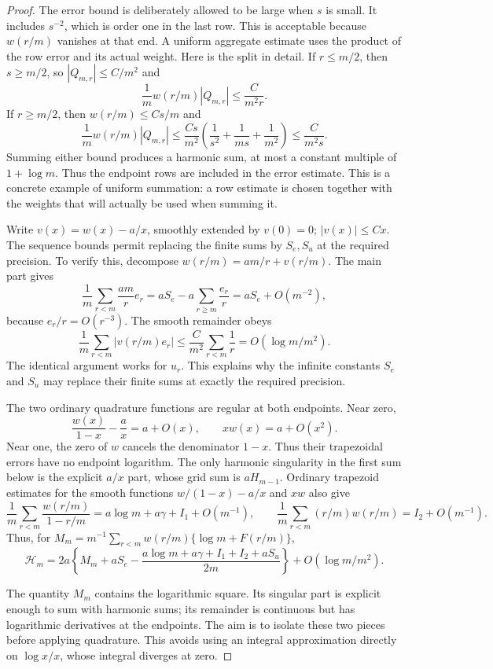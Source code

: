 \begin{proof}
The error bound is deliberately allowed to be large when $s$ is
small. It includes $s^{-2}$, which is order one in the last row.
This is acceptable because $w(r/m)$ vanishes at that end.
A uniform aggregate estimate uses the product of the row error and
its actual weight.
Here is the split in detail. If $r\leq m/2$, then $s\geq m/2$,
so $|Q_{m,r}|\leq C/m^2$ and
\[
 \frac1m w(r/m)|Q_{m,r}|\leq\frac{C}{m^2r}.
\]
If $r\geq m/2$, then $w(r/m)\leq Cs/m$ and
\[
 \frac1m w(r/m)|Q_{m,r}|
 \leq \frac{Cs}{m^2}
       \left(\frac1{s^2}+\frac1{ms}+\frac1{m^2}\right)
 \leq\frac{C}{m^2s}.
\]
Summing either bound produces a harmonic sum, at most a constant
multiple of $1+\log m$. Thus the endpoint rows are included in
the error estimate. This is a concrete example of uniform
summation: a row estimate is chosen together with the weights that
will actually be used when summing it.

Write $v(x)=w(x)-a/x$, smoothly extended by $v(0)=0$; $|v(x)|\leq Cx$.
The sequence bounds permit replacing the finite sums by
$S_e,S_u$ at the required precision. To verify this, decompose $w(r/m)=am/r+v(r/m)$. The main part gives
\[
 \frac1m\sum_{r<m}\frac{am}{r}e_r
   =aS_e-a\sum_{r\geq m}\frac{e_r}{r}
   =aS_e+O(m^{-2}),
\]
because $e_r/r=O(r^{-3})$. The smooth remainder obeys
\[
 \frac1m\sum_{r<m}|v(r/m)e_r|
 \leq\frac{C}{m^2}\sum_{r<m}\frac1r
       =O(\log m/m^2).
\]
The identical argument works for $u_r$. This explains why the
infinite constants $S_e$ and $S_u$ may replace their finite sums
at exactly the required precision.

The two ordinary quadrature functions are regular at both endpoints.
Near zero,
\[
 \frac{w(x)}{1-x}-\frac ax
   =a+O(x),\qquad xw(x)=a+O(x^2).
\]
Near one, the zero of $w$ cancels the denominator $1-x$.
Thus their trapezoidal errors have no endpoint logarithm.
The only harmonic singularity in the first sum below is the
explicit $a/x$ part, whose grid sum is $aH_{m-1}$. Ordinary trapezoid estimates for
the smooth functions $w/(1-x)-a/x$ and $xw$ also give
\[
 \frac1m\sum_{r<m}\frac{w(r/m)}{1-r/m}
     =a\log m+a\gamma+I_1+O(m^{-1}),\qquad
 \frac1m\sum_{r<m}(r/m)w(r/m)=I_2+O(m^{-1}).
\]
Thus, for $M_m=m^{-1}\sum_{r<m}w(r/m)\{\log m+F(r/m)\}$,
\begin{equation}\label{cu:H-to-M}
 \mathcal H_m=2a\left\{M_m+aS_e-
    \frac{a\log m+a\gamma+I_1+I_2+aS_u}{2m}\right\}
                      +O(\log m/m^2).
\end{equation}

The quantity $M_m$ contains the logarithmic square. Its singular
part is explicit enough to sum with harmonic sums; its remainder
is continuous but has logarithmic derivatives at the endpoints.
The aim is to isolate these two pieces before applying quadrature.
This avoids using an integral approximation directly on
$\log x/x$, whose integral diverges at zero.


\end{proof}
